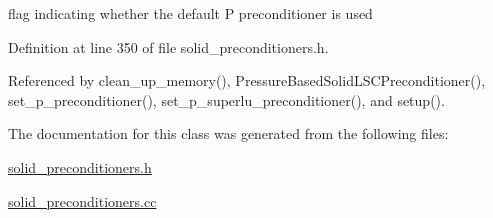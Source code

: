 flag indicating whether the default P preconditioner is used 



Definition at line 350 of file solid\+\_\+preconditioners.\+h.



Referenced by clean\+\_\+up\+\_\+memory(), Pressure\+Based\+Solid\+L\+S\+C\+Preconditioner(), set\+\_\+p\+\_\+preconditioner(), set\+\_\+p\+\_\+superlu\+\_\+preconditioner(), and setup().



The documentation for this class was generated from the following files\+:\begin{DoxyCompactItemize}
\item 
\hyperlink{solid__preconditioners_8h}{solid\+\_\+preconditioners.\+h}\item 
\hyperlink{solid__preconditioners_8cc}{solid\+\_\+preconditioners.\+cc}\end{DoxyCompactItemize}
